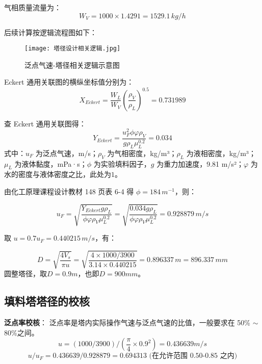 气相质量流量为：
\begin{equation}
	W_{V} = 1000 \times 1.4291 = 1529.1 \, kg/h
\end{equation}

后续计算按逻辑流程图如下：
\begin{figure}[hbtp]
	\centering
	\texttt{[image: 塔径设计相关逻辑.jpg]}
	\captionsetup{skip=2pt} %
	\caption{泛点气速-塔径相关逻辑示意图}
	\label{fig:塔径计算相关逻辑流程图}
\end{figure}

Eckert 通用关联图的横纵坐标值分别为：
\begin{equation}
	X_{Eckert} = \frac{W_{L}}{W_{V}} \left( \frac{\rho_{V}}{\rho_{L}} \right)^{0.5} = 0.731989
\end{equation}

查 Eckert 通用关联图得：
\begin{equation}
	Y_{Eckert} = \frac{u_F^2 \phi \varphi \rho_{V}}{g \rho_{L} \mu_{L}^{0.2}} = 0.034
\end{equation}
式中：$u_F$ 为泛点气速，m/s；$\rho_{V}$ 为气相密度，kg/m³；$\rho_{L}$ 为液相密度，kg/m³；$\mu_{L}$ 为液体黏度，mPa·s；$\phi$ 为实验填料因子，$g$ 为重力加速度，9.81 m/s²；$\varphi$ 为水的密度与液体密度之比，此处为$1$。

由化工原理课程设计教材 148 页表 6-4 得 $\phi = 184 \, m^{-1}$，则：

\begin{equation}
	u_F = \sqrt{\frac{Y_{Eckert} g \rho_{L}}{\phi \varphi \rho_{V} \mu_{L}^{0.2}}} = \sqrt{\frac{0.034 g \rho_{L}}{\phi \varphi \rho_{V} \mu_{L}^{0.2}}} = 0.9 28879 \, m/s
\end{equation}

取 $u = 0.7 u_F = 0.440215 \, m/s$，有：

\begin{equation}
	D = \sqrt{\frac{4V_{s}}{\pi u}} = \sqrt{\frac{4 \times 1000/3900}{3.14 \times 0.440215}} = 0.896337 \, m = 896.337 \, mm
\end{equation}
圆整塔径，取$D=0.9 m$，也即$D=900mm$。

\subsection{填料塔塔径的校核}

\textbf{泛点率校核}：
泛点率是塔内实际操作气速与泛点气速的比值，一般要求在 50\% $\sim$ 80\%之间。
\begin{equation}
	u =(1000/3900)/(\frac{\pi}{4} \times 0.9 ^2)= 0.436639 m/s
\end{equation}
\begin{equation}
	u/u_{F} = 0.436639 / 0.9 28879 = 0.694313 \text{ (在允许范围 0.50-0.85 之内)}
\end{equation}

